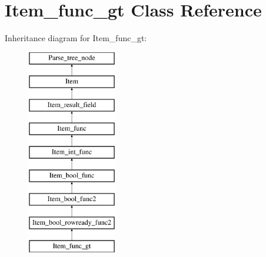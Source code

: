 \hypertarget{classItem__func__gt}{}\section{Item\+\_\+func\+\_\+gt Class Reference}
\label{classItem__func__gt}
Inheritance diagram for Item\+\_\+func\+\_\+gt\+:\begin{figure}[H]
\begin{center}
\leavevmode
\includegraphics[height=9.000000cm]{classItem__func__gt}
\end{center}
\end{figure}
